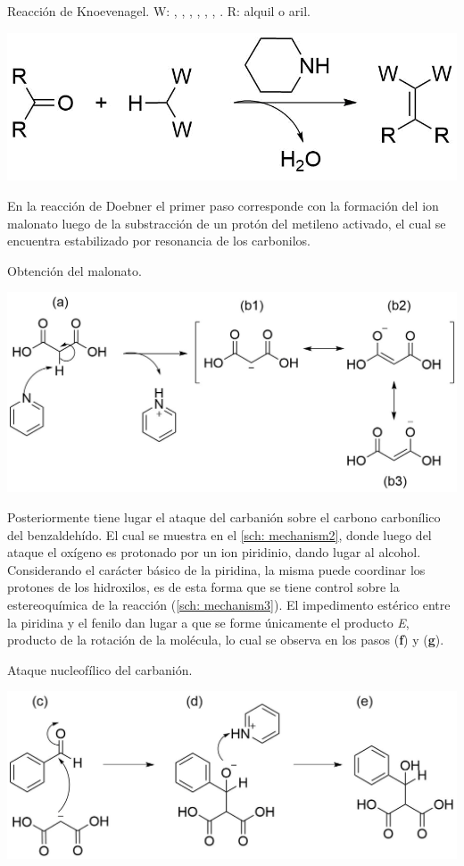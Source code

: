 \documentclass[fleqn,11pt]{SelfArx}
\begin{document}
\begin{scheme}[h]
	\centering
	\caption{Reacción de Knoevenagel. W: , , , , , , . R: alquil o aril.}
	\includegraphics[width=0.8\linewidth]{structures/knoevenagel.png}
	\label{sch: knoevenagel}
\end{scheme}

En la reacción de Doebner el primer paso corresponde con la formación del ion malonato luego de la substracción de un protón del metileno activado, el cual se encuentra estabilizado por resonancia de los carbonilos.
\begin{scheme}[h]
	\centering
	\caption{Obtención del malonato.}
	\includegraphics[width=\linewidth]{structures/mechanism1.png}
\end{scheme}

\newpage
Posteriormente tiene lugar el ataque del carbanión sobre el carbono carbonílico del benzaldehído. El cual se muestra en el \autoref{sch: mechanism2}, donde luego del ataque el oxígeno es protonado por un ion piridinio, dando lugar al alcohol. Considerando el carácter básico de la piridina, la misma puede coordinar los protones de los hidroxilos, es de esta forma que se tiene control sobre la estereoquímica de la reacción (\autoref{sch: mechanism3}). El impedimento estérico entre la piridina y el fenilo dan lugar a que se forme únicamente el producto \textit{E}, producto de la rotación de la molécula, lo cual se observa en los pasos (\textbf{f}) y (\textbf{g}).
\begin{scheme}[h]
	\centering
	\caption{Ataque nucleofílico del carbanión.}
	\includegraphics[width=\linewidth]{structures/mechanism2.png}
	\label{sch: mechanism2}
\end{scheme}
\end{document}
